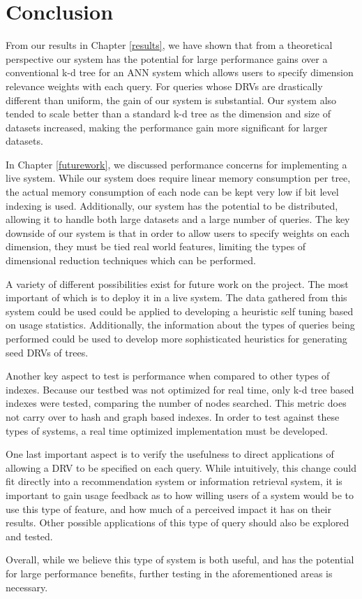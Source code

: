 \chapter{Conclusion} %

\label{conclusion} %


From our results in Chapter \ref{results}, we have shown that from a theoretical perspective our system has the potential for large performance gains over a conventional k-d tree for an ANN system which allows users to specify dimension relevance weights with each query.  For queries whose DRVs are drastically different than uniform, the gain of our system is substantial.  Our system also tended to scale better than a standard k-d tree as the dimension and size of datasets increased, making the performance gain more significant for larger datasets.

In Chapter \ref{futurework}, we discussed performance concerns for implementing a live system.  While our system does require linear memory consumption per tree, the actual memory consumption of each node can be kept very low if bit level indexing is used.  Additionally, our system has the potential to be distributed, allowing it to handle both large datasets and a large number of queries.  The key downside of our system is that in order to allow users to specify weights on each dimension, they must be tied real world features, limiting the types of dimensional reduction techniques which can be performed.

A variety of different possibilities exist for future work on the project.  The most important of which is to deploy it in a live system.  The data gathered from this system could be used could be applied to developing a heuristic self tuning based on usage statistics.  Additionally, the information about the types of queries being performed could be used to develop more sophisticated heuristics for generating seed DRVs of trees.

Another key aspect to test is performance when compared to other types of indexes.  Because our testbed was not optimized for real time, only k-d tree based indexes were tested, comparing the number of nodes searched.  This metric does not carry over to hash and graph based indexes.  In order to test against these types of systems, a real time optimized implementation must be developed.

One last important aspect is to verify the usefulness to direct applications of allowing a DRV to be specified on each query.  While intuitively, this change could fit directly into a recommendation system or information retrieval system, it is important to gain usage feedback as to how willing users of a system would be to use this type of feature, and  how much of a perceived impact it has on their results.  Other possible applications of this type of query should also be explored and tested.

Overall, while we believe this type of system is both useful, and has the potential for large performance benefits, further testing in the aforementioned areas is necessary.
